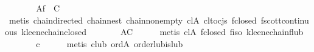 \begin{isabellebody}
\ \ \isamarkupfalse%
\ \isamarkupfalse%
\ {}{}{}{}\ {}\ {}\isactrlbsub Af\ {}\ {}C{}{}\isanewline
\ \ \ \ \isamarkupfalse%
\ {}metis\ chain{}directed\ chain{}nest\ chain{}non{}empty\ cl{}A\ cl{}to{}cjs\ f{}closed\ f{}scott{}continuous\ kleene{}chain{}closed{}\isanewline
\ \ \isamarkupfalse%
\ \isamarkupfalse%
\ {}{}{}{}\ {}\ {}\isactrlbsub AC{}\isanewline
\ \ \ \ \isamarkupfalse%
\ {}metis\ cl{}A\ f{}closed\ f{}iso\ kleene{}chain{}f{}lub{}\isanewline
\ \ \isamarkupfalse%
\ \isamarkupfalse%
\ {}{}{}{}\ {}\ c{}\isanewline
\ \ \ \ \isamarkupfalse%
\ {}metis\ c{}lub\ ord{}A\ order{}lub{}is{}lub{}\isanewline

\end{isabellebody}

